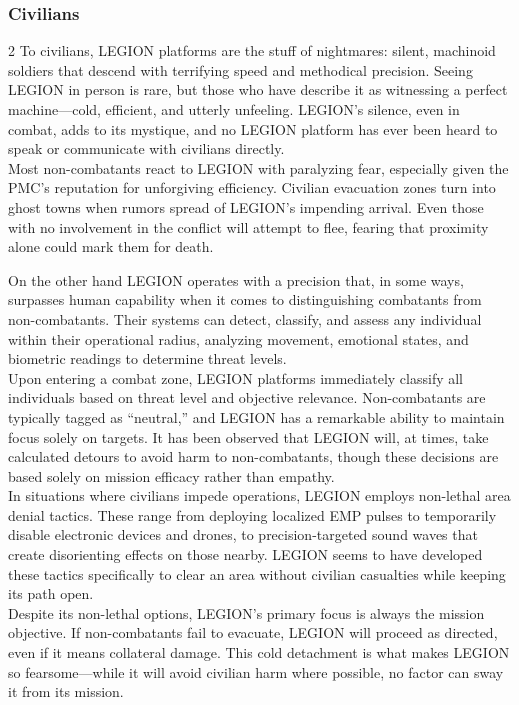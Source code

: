 \subsubsection*{Civilians}
\vspace{5mm}
\begin{multicols}{2}
To civilians, LEGION platforms are the stuff of nightmares: silent, machinoid soldiers that descend with terrifying speed and methodical precision. Seeing LEGION in person is rare, but those who have describe it as witnessing a perfect machine—cold, efficient, and utterly unfeeling. LEGION’s silence, even in combat, adds to its mystique, and no LEGION platform has ever been heard to speak or communicate with civilians directly.
\\%
Most non-combatants react to LEGION with paralyzing fear, especially given the PMC’s reputation for unforgiving efficiency. Civilian evacuation zones turn into ghost towns when rumors spread of LEGION’s impending arrival. Even those with no involvement in the conflict will attempt to flee, fearing that proximity alone could mark them for death.
\par
On the other hand LEGION operates with a precision that, in some ways, surpasses human capability when it comes to distinguishing combatants from non-combatants. Their systems can detect, classify, and assess any individual within their operational radius, analyzing movement, emotional states, and biometric readings to determine threat levels.
\\%
Upon entering a combat zone, LEGION platforms immediately classify all individuals based on threat level and objective relevance. Non-combatants are typically tagged as “neutral,” and LEGION has a remarkable ability to maintain focus solely on targets. It has been observed that LEGION will, at times, take calculated detours to avoid harm to non-combatants, though these decisions are based solely on mission efficacy rather than empathy.
\\%
In situations where civilians impede operations, LEGION employs non-lethal area denial tactics. These range from deploying localized EMP pulses to temporarily disable electronic devices and drones, to precision-targeted sound waves that create disorienting effects on those nearby. LEGION seems to have developed these tactics specifically to clear an area without civilian casualties while keeping its path open.
\\%
Despite its non-lethal options, LEGION’s primary focus is always the mission objective. If non-combatants fail to evacuate, LEGION will proceed as directed, even if it means collateral damage. This cold detachment is what makes LEGION so fearsome—while it will avoid civilian harm where possible, no factor can sway it from its mission.

\end{multicols}
